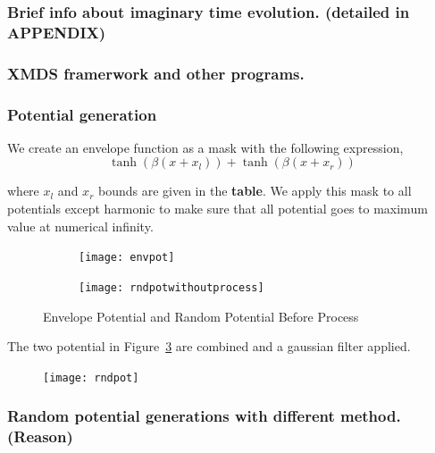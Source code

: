 \documentclass[a4paper,times,12pt]{article}
\begin{document}
\subsubsection{Brief info about imaginary time evolution. (detailed in APPENDIX)}
\subsubsection{XMDS framerwork and other programs.}
\subsubsection{Potential generation}

We create an envelope function as a mask with the following expression,
\begin{equation}
\label{eq:envelope_potential}
    \tanh{(\beta(x + x_l))} + \tanh{(\beta(x + x_r))}
\end{equation}

where $x_l$ and $x_r$ bounds are given in the \textbf{table}. We apply this mask to all potentials except harmonic to make sure that all potential goes to maximum value at numerical infinity.  

\graphicspath{{"../figs/numericanalyze/"}}
\begin{figure}[H]
    \centering
    \begin{subfigure}[t]{0.45\textwidth}
        \texttt{[image: envpot]}
		\label{fig:a}
    \end{subfigure}
    \begin{subfigure}[t]{0.45\textwidth}
        \texttt{[image: rndpotwithoutprocess]}
		\label{fig:b}
    \end{subfigure}
\caption{Envelope Potential and Random Potential Before Process}
\label{fig:envelope_and_random_withot_pros}
\end{figure}

The two potential in Figure~\ref{fig:envelope_and_random_withot_pros} are combined and a gaussian filter applied. 


\begin{figure}[H]
\centering
    \texttt{[image: rndpot]}
\caption{}
\label{fig:a}
\end{figure}





\subsubsection{Random potential generations with different method. (Reason)}
\label{sec:random_potential_gen}
\end{document}
